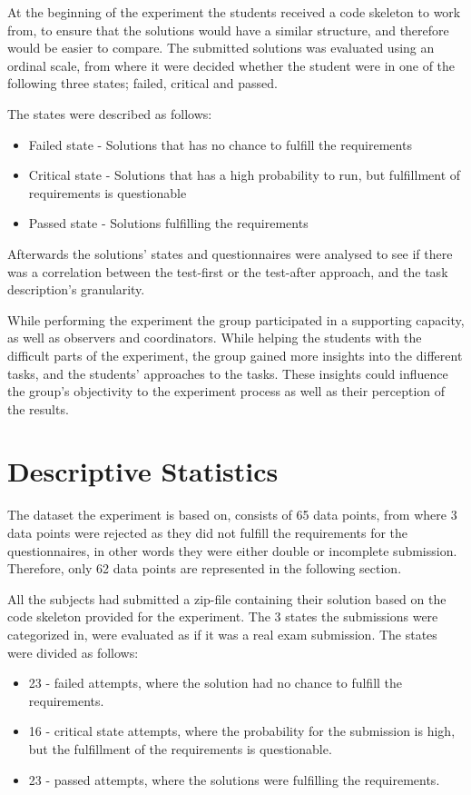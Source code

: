 \documentclass{sig-alternate-05-2015}
\begin{document}
At the beginning of the experiment the students received a code skeleton to work from, to ensure that the solutions would have a similar structure, and therefore would be easier to compare. The submitted solutions was evaluated using an ordinal scale, from where it were decided whether the student were in one of the following three states; failed, critical and passed.

The states were described as follows:
\begin{itemize}
	\item Failed state - Solutions that has no chance to fulfill the requirements
	\item Critical state - Solutions that has a high probability to run, but fulfillment of requirements is questionable
	\item Passed state - Solutions fulfilling the requirements
\end{itemize}

Afterwards the solutions' states and questionnaires were analysed to see if there was a correlation between the test-first or the test-after approach, and the task description's granularity.

While performing the experiment the group participated in a supporting capacity, as well as observers and coordinators. While helping the students with the difficult parts of the experiment, the group gained more insights into the different tasks, and the students' approaches to the tasks. These insights could influence the group's objectivity to the experiment process as well as their perception of the results.

\section{Descriptive Statistics}
The dataset the experiment is based on, consists of 65 data points, from where 3 data points were rejected as they did not fulfill the requirements for the questionnaires, in other words they were either double or incomplete submission. Therefore, only 62 data points are represented in the following section.

All the subjects had submitted a zip-file containing their solution based on the code skeleton provided for the experiment. The 3 states the submissions were categorized in, were evaluated as if it was a real exam submission.
The states were divided as follows:

\begin{itemize}
	\item 23 - failed attempts, where the solution had no chance to fulfill the requirements.
	\item 16 - critical state attempts, where the probability for the submission is high, but the fulfillment of the requirements is questionable.
	\item 23 - passed attempts, where the solutions were fulfilling the requirements.
\end{itemize}
\end{document}
